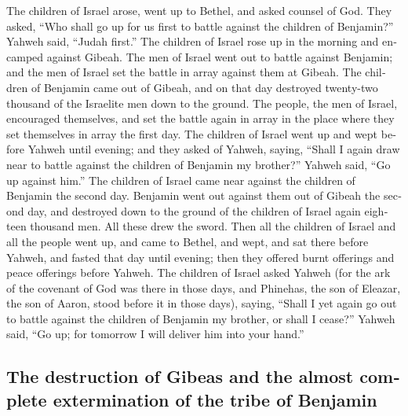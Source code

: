 \begin{paracol}{2}
\begin{otherlanguage}{english}
 The children of Israel arose, went up to Bethel, and
asked counsel of God. They asked, ``Who shall go up for us first to
battle against the children of Benjamin?'' Yahweh said, ``Judah first.''
 The children of Israel rose up in the morning and
encamped against Gibeah.  The men of Israel went out to
battle against Benjamin; and the men of Israel set the battle in array
against them at Gibeah.  The children of Benjamin came
out of Gibeah, and on that day destroyed twenty-two thousand of the
Israelite men down to the ground.  The people, the men of
Israel, encouraged themselves, and set the battle again in array in the
place where they set themselves in array the first day. 
The children of Israel went up and wept before Yahweh until evening; and
they asked of Yahweh, saying, ``Shall I again draw near to battle
against the children of Benjamin my brother?'' Yahweh said, ``Go up
against him.''  The children of Israel came near against
the children of Benjamin the second day.  Benjamin went
out against them out of Gibeah the second day, and destroyed down to the
ground of the children of Israel again eighteen thousand men. All these
drew the sword.  Then all the children of Israel and all
the people went up, and came to Bethel, and wept, and sat there before
Yahweh, and fasted that day until evening; then they offered burnt
offerings and peace offerings before Yahweh.  The
children of Israel asked Yahweh (for the ark of the covenant of God was
there in those days,  and Phinehas, the son of Eleazar,
the son of Aaron, stood before it in those days), saying, ``Shall I yet
again go out to battle against the children of Benjamin my brother, or
shall I cease?'' Yahweh said, ``Go up; for tomorrow I will deliver him
into your hand.''

\hypertarget{the-destruction-of-gibeas-and-the-almost-complete-extermination-of-the-tribe-of-benjamin}{%
\subsection{The destruction of Gibeas and the almost complete
extermination of the tribe of
Benjamin}\label{the-destruction-of-gibeas-and-the-almost-complete-extermination-of-the-tribe-of-benjamin}}


\end{otherlanguage}
\end{paracol}
